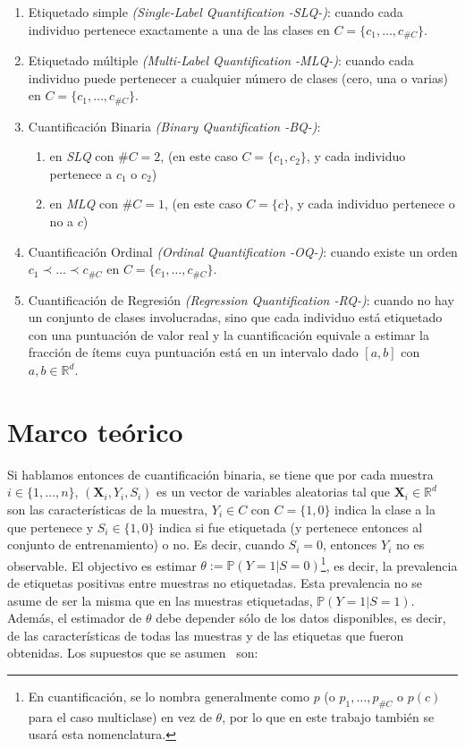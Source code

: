 \begin{enumerate}
    \item Etiquetado simple {\it (Single-Label Quantification -SLQ-)\/}: cuando
    cada individuo pertenece exactamente a una de las clases en
    $C=\{c_1,\dots,c_{\#C}\}$.
    \item Etiquetado múltiple {\it (Multi-Label Quantification -MLQ-)\/}: cuando
    cada individuo puede pertenecer a cualquier número de clases (cero, una o
    varias) en $C=\{c_1,\dots,c_{\#C}\}$.
    \item Cuantificación Binaria {\it (Binary Quantification -BQ-)\/}:
    \begin{enumerate}
        \item en {\it SLQ\/} con $\#C=2$, (en este caso $C=\{c_1,c_2\}$, y cada
        individuo pertenece a $c_1$ o $c_2$)
        \item en {\it MLQ\/} con $\#C=1$, (en este caso $C=\{c\}$, y cada
        individuo pertenece o no a $c$)
    \end{enumerate}
    \item Cuantificación Ordinal {\it (Ordinal Quantification -OQ-)\/}: cuando
    existe un orden $c_1 \prec \dots \prec c_{\#C}$ en
    $C=\{c_1,\dots,c_{\#C}\}$.
    \item Cuantificación de Regresión {\it (Regression Quantification -RQ-)\/}:
    cuando no hay un conjunto de clases involucradas, sino que cada individuo
    está etiquetado con una puntuación de valor real y la cuantificación
    equivale a estimar la fracción de ítems cuya puntuación está en un intervalo
    dado $[a, b]$ con ${a, b \in \mathbb{R}^d}$.
\end{enumerate}

\section{Marco teórico}\label{problema:marco_teorico}

Si hablamos entonces de cuantificación binaria, se tiene que por cada muestra $i
\in \{1,\dots,n\}$, $(\boldsymbol{X}_i,Y_i,S_i)$ es un vector de variables
aleatorias tal que $\boldsymbol{X}_i \in \mathbb{R}^d$ son las características
de la muestra, $Y_i \in C$ con $C=\{1,0\}$ indica la clase a la que pertenece y
$S_i \in \{1,0\}$ indica si fue etiquetada (y pertenece entonces al conjunto de
entrenamiento) o no. Es decir, cuando $S_i=0$, entonces $Y_i$ no es observable.
El objectivo es estimar $\theta:= \mathbb{P}(Y=1|S=0)$\footnote{En
cuantificación, se lo nombra generalmente como $p$ (o $p_1,\dots,p_{\#C}$ o
$p(c)$ para el caso multiclase) en vez de $\theta$, por lo que en este trabajo
también se usará esta nomenclatura.}, es decir, la prevalencia de etiquetas
positivas entre muestras no etiquetadas. Esta prevalencia no se asume de ser la
misma que en las muestras etiquetadas, $\mathbb{P}(Y=1|S=1)$. Además, el
estimador de $\theta$ debe depender sólo de los datos disponibles, es decir, de
las características de todas las muestras y de las etiquetas que fueron
obtenidas. Los supuestos que se asumen~\cite{vaz2019quantification} son:

